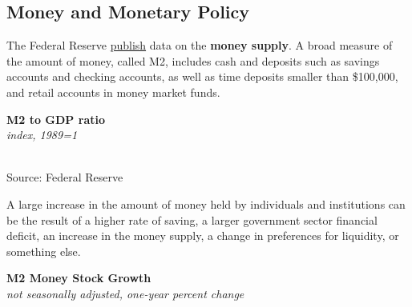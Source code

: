 \documentclass{report}
\makeatletter
\newcommand{\tbllink}[1]{\href{https://raw.githubusercontent.com/bdecon/US-chartbook/master/chartbook/data/#1}{\faTable}}
\newcommand*\short[1]{\expandafter\@gobbletwo\number\numexpr#1\relax}
\newcommand{\dateaxisticks}{
		date coordinates in=x, axis line style={draw=none},
		xmax={2023-10-01},
		max space between ticks=40,	    
		xtick={{1990-01-01}, {1992-01-01}, {1994-01-01}, 
			{1996-01-01}, {1998-01-01}, {2000-01-01}, 
			{2002-01-01}, {2004-01-01}, {2006-01-01},
			{2008-01-01}, {2010-01-01}, {2012-01-01}, {2014-01-01},
		    {2016-01-01}, {2018-01-01}, {2020-01-01}, {2022-01-01}, 
		    {2024-01-01}, {2026-01-01}},
		minor xtick={{1989-01-01}, {1991-01-01}, {1993-01-01},
			{1995-01-01}, {1997-01-01}, {1999-01-01}, 
			{2001-01-01}, {2003-01-01}, {2005-01-01}, {2007-01-01},
		    {2009-01-01}, {2011-01-01}, {2013-01-01}, {2015-01-01},
		    {2017-01-01}, {2019-01-01}, {2021-01-01}, {2023-01-01}, 
		    {2025-01-01}, {2027-01-01}},
		enlarge y limits={0.06}, enlarge x limits={0.01},
		}
\newcommand{\shdateaxisticks}{
		date coordinates in=x, axis line style={draw=none},
		xmax={2023-10-01},
		max space between ticks=40,	    
		xtick={{1990-01-01}, {1995-01-01}, {2000-01-01}, 
			{2005-01-01}, {2010-01-01}, {2015-01-01}, {2020-01-01}},
		minor xtick={},
		enlarge y limits={0.06}, enlarge x limits={0.01},
		}
\newcommand{\bbar}[2]{extra #1 ticks = {{#2}}, extra #1 tick labels = ,
		extra #1 tick style = {grid=major, grid style={thick, black!25}},}
\newcommand{\thickline}[4]{\addplot[ultra thick, no markers, color=#1] 
		table [x=#2, y=#3, col sep=comma] {#4};	}
\newcommand{\rbars}{
		\fill[color=black!10] (axis cs:{1990-07-01},\pgfkeysvalueof{/pgfplots/ymin}) rectangle 
			(axis cs:{1991-03-01}, \pgfkeysvalueof{/pgfplots/ymax});
		\fill[color=black!10] (axis cs:{2007-12-01},\pgfkeysvalueof{/pgfplots/ymin}) rectangle 
			(axis cs:{2009-07-01}, \pgfkeysvalueof{/pgfplots/ymax});
		\fill[color=black!10] (axis cs:{2001-03-01},\pgfkeysvalueof{/pgfplots/ymin}) rectangle 
			(axis cs:{2001-11-01}, \pgfkeysvalueof{/pgfplots/ymax});
		\fill[color=black!10] (axis cs:{2020-02-01},\pgfkeysvalueof{/pgfplots/ymin}) rectangle 
			(axis cs:{2020-05-01}, \pgfkeysvalueof{/pgfplots/ymax});}
\makeatother
\begin{document}
{\begin{minipage}{0.76\textwidth}
\subsection*{Money and Monetary Policy}  
\small The Federal Reserve \href{https://www.federalreserve.gov/releases/h6/current/default.htm}{publish} data on the \textbf{money supply}. A broad measure of the amount of money, called M2, includes cash and deposits such as savings accounts and checking accounts, as well as time deposits smaller than \$100,000, and retail accounts in money market funds. 

\begin{minipage}{0.48\textwidth}

\end{minipage} \hfill \begin{minipage}{0.45\textwidth}
\normalsize \textbf{M2 to GDP ratio}\\
\footnotesize{\textit{index, 1989=1}}\\
\hspace*{-2mm} \\
\footnotesize{Source: Federal Reserve} \hfill \tbllink{m2gdp.csv}
\end{minipage}
\vspace{2mm}

A large increase in the amount of money held by individuals and institutions can be the result of a higher rate of saving, a larger government sector financial deficit, an increase in the money supply, a change in preferences for liquidity, or something else.


\vspace{2mm}

\normalsize \textbf{M2 Money Stock Growth}\\
\footnotesize{\textit{not seasonally adjusted, one-year percent change}}
\vspace{3.2cm}

\hspace*{4mm} 


\end{minipage}}
\end{document}
